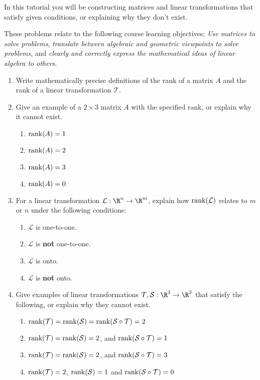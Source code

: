 		\begin{objectives}
	In this tutorial you will be constructing matrices and linear transformations that satisfy
			given conditions, or explaining why they don't exist.

	These problems relate to the following course learning objectives:
			\textit{Use matrices to solve problems},
			\textit{translate between algebraic and geometric viewpoints to solve problems}, and
			\textit{clearly and correctly express the mathematical ideas of linear algebra to others}.
		\end{objectives}


\begin{enumerate}
	\item Write mathematically precise definitions of the rank of a matrix $A$ and the rank of a linear transformation $\mathcal{T}$.

	\item Give an example of a $2\times 3$ matrix $A$ with the specified rank, or explain why it cannot exist.
	\begin{enumerate}
		\item $\operatorname{rank}(A) = 1$
		\item $\operatorname{rank}(A) = 2$
		\item $\operatorname{rank}(A) = 3$
		\item $\operatorname{rank}(A) = 0$
	\end{enumerate}

	\item For a linear transformation $\mathcal L: \R^n\to \R^m$, explain how $\operatorname{rank}(\mathcal L)$ relates to $m$ or $n$ under the following conditions:
	\begin{enumerate}
		\item $\mathcal L$ is one-to-one.
		\item $\mathcal L$ is {\bf not} one-to-one.
		\item $\mathcal L$ is onto.
		\item $\mathcal L$ is {\bf not} onto.
	\end{enumerate}

	\item Give examples of linear transformations $\mathcal T, \mathcal S: \R^3\to\R^3$ that satisfy the following, or explain why they cannot exist.
	\begin{enumerate}
		\item $\operatorname{rank}(\mathcal T)=\operatorname{rank}(\mathcal S)=\operatorname{rank}(\mathcal S\circ \mathcal T)=2$
		\item $\operatorname{rank}(\mathcal T)=\operatorname{rank}(\mathcal S)=2$, and $\operatorname{rank}(\mathcal S\circ \mathcal T)=1$
		\item $\operatorname{rank}(\mathcal T)=\operatorname{rank}(\mathcal S)=2$, and $\operatorname{rank}(\mathcal S\circ \mathcal T)=3$
		\item $\operatorname{rank}(\mathcal T)=2$, $\operatorname{rank}(\mathcal S)=1$ and $\operatorname{rank}(\mathcal S\circ \mathcal T)=0$
	\end{enumerate}


\end{enumerate}
